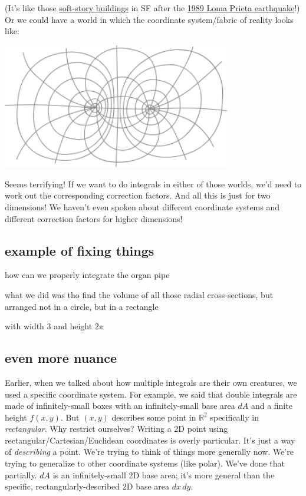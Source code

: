 \documentclass[
]{article}
\begin{document}
(It's like those \href{https://en.wikipedia.org/wiki/Soft_story_building}{soft-story buildings} in SF after the \href{https://en.wikipedia.org/wiki/1989_Loma_Prieta_earthquake}{1989 Loma Prieta earthquake}!) Or we could have a world in which the coordinate system/fabric of reality looks like:

\includegraphics[width=0.75\textwidth,height=\textheight]{hipster-diy-coordinates-2.svg}

Seems terrifying! If we want to do integrals in either of those worlds, we'd need to work out the corresponding correction factors. And all this is just for two dimensions! We haven't even spoken about different coordinate systems and different correction factors for higher dimensions!

\hypertarget{example-of-fixing-things}{%
\subsection{example of fixing things}\label{example-of-fixing-things}}

how can we properly integrate the organ pipe

what we did was tho find the volume of all those radial cross-sections, but arranged not in a circle, but in a rectangle

with width 3 and height \(2\pi\)

\hypertarget{even-more-nuance}{%
\subsection{even more nuance}\label{even-more-nuance}}

Earlier, when we talked about how multiple integrals are their own creatures, we used a specific coordinate system. For example, we said that double integrals are made of infinitely-small boxes with an infinitely-small base area \(dA\) and a finite height \(f(x,y)\). But \((x,y)\) describes some point in \(\mathbb{R}^2\) specifically in \emph{rectangular}. Why restrict ourselves? Writing a 2D point using rectangular/Cartesian/Euclidean coordinates is overly particular. It's just a way of \emph{describing} a point. We're trying to think of things more generally now. We're trying to generalize to other coordinate systems (like polar). We've done that partially. \(dA\) is an infinitely-small 2D base area; it's more general than the specific, rectangularly-described 2D base area \(dx\, dy\).
\end{document}
